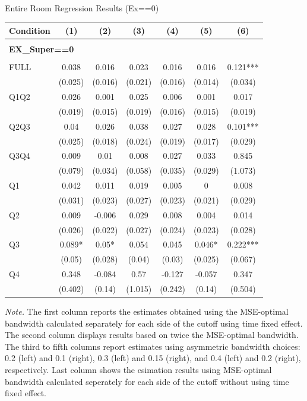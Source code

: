 \begin{table}[]
\TABLE
{Entire Room Regression Results (Ex==0) \label{result_detail2}}{\begin{tabular}{lcccccc}
\hline
Condition & (1) & (2) & (3) & (4) & (5) & (6) \\ \hline
\\ 
\multicolumn{5}{l}{\textbf{EX\_Super==0}} \\ 
\\ 
FULL & 0.038 & 0.016 & 0.023 & 0.016 & 0.016 & 0.121*** \\ 
&(0.025)&(0.016) & (0.021)&(0.016)&(0.014)&(0.034)\\ 
Q1Q2 & 0.026 & 0.001 & 0.025 & 0.006 & 0.001 & 0.017 \\ 
&(0.019)&(0.015) & (0.019)&(0.016)&(0.015)&(0.019)\\ 
Q2Q3 & 0.04 & 0.026 & 0.038 & 0.027 & 0.028 & 0.101*** \\ 
&(0.025)&(0.018) & (0.024)&(0.019)&(0.017)&(0.029)\\ 
Q3Q4 & 0.009 & 0.01 & 0.008 & 0.027 & 0.033 & 0.845 \\ 
&(0.079)&(0.034) & (0.058)&(0.035)&(0.029)&(1.073)\\ 
Q1 & 0.042 & 0.011 & 0.019 & 0.005 & 0 & 0.008 \\ 
&(0.031)&(0.023) & (0.027)&(0.023)&(0.021)&(0.029)\\ 
Q2 & 0.009 & -0.006 & 0.029 & 0.008 & 0.004 & 0.014 \\ 
&(0.026)&(0.022) & (0.027)&(0.024)&(0.023)&(0.028)\\ 
Q3 & 0.089* & 0.05* & 0.054 & 0.045 & 0.046* & 0.222*** \\ 
&(0.05)&(0.028) & (0.04)&(0.03)&(0.025)&(0.067)\\ 
Q4 & 0.348 & -0.084 & 0.57 & -0.127 & -0.057 & 0.347 \\ 
&(0.402)&(0.14) & (1.015)&(0.242)&(0.14)&(0.504)\\ 
\hline 
 \end{tabular}}{\textit{Note.} The first column reports the estimates obtained using the MSE-optimal bandwidth calculated separately for each side of the cutoff using time fixed effect. The second column displays results based on twice the MSE-optimal bandwidth. The third to fifth columns report estimates using asymmetric bandwidth choices: 0.2 (left) and 0.1 (right), 0.3 (left) and 0.15 (right), and 0.4 (left) and 0.2 (right), respectively. Last column shows the esimation results using MSE-optimal bandwidth calculated seperately for each side of the cutoff without using time fixed effect.}
\end{table}
